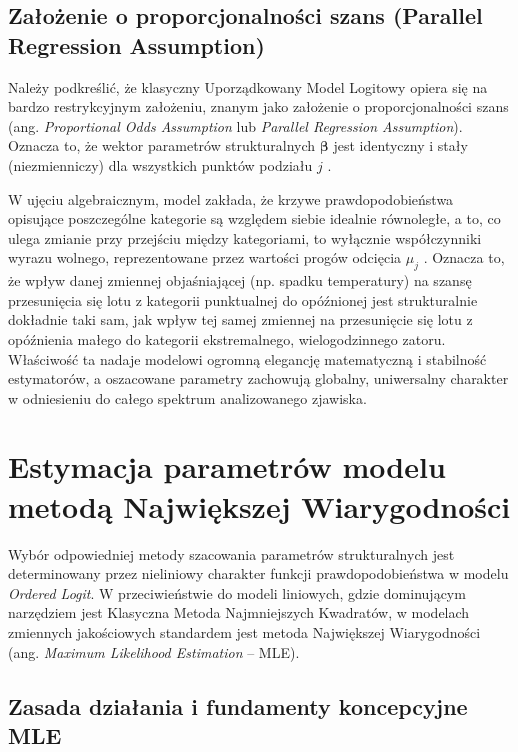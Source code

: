 \subsection{Założenie o proporcjonalności szans (Parallel Regression Assumption)}

Należy podkreślić, że klasyczny Uporządkowany Model Logitowy opiera się na bardzo restrykcyjnym założeniu, znanym jako założenie o proporcjonalności szans (ang. \textit{Proportional Odds Assumption} lub \textit{Parallel Regression Assumption}). Oznacza to, że wektor parametrów strukturalnych $\boldsymbol{\beta}$ jest identyczny i stały (niezmienniczy) dla wszystkich punktów podziału $j$ \cite{greene2003}.

W ujęciu algebraicznym, model zakłada, że krzywe prawdopodobieństwa opisujące poszczególne kategorie są względem siebie idealnie równoległe, a to, co ulega zmianie przy przejściu między kategoriami, to wyłącznie współczynniki wyrazu wolnego, reprezentowane przez wartości progów odcięcia $\mu_j$ \cite{jackowska2011}. Oznacza to, że wpływ danej zmiennej objaśniającej (np. spadku temperatury) na szansę przesunięcia się lotu z kategorii punktualnej do opóźnionej jest strukturalnie dokładnie taki sam, jak wpływ tej samej zmiennej na przesunięcie się lotu z opóźnienia małego do kategorii ekstremalnego, wielogodzinnego zatoru. Właściwość ta nadaje modelowi ogromną elegancję matematyczną i stabilność estymatorów, a oszacowane parametry zachowują globalny, uniwersalny charakter w odniesieniu do całego spektrum analizowanego zjawiska. 

\section{Estymacja parametrów modelu metodą Największej Wiarygodności}

Wybór odpowiedniej metody szacowania parametrów strukturalnych jest determinowany przez nieliniowy charakter funkcji prawdopodobieństwa w modelu \textit{Ordered Logit}. W przeciwieństwie do modeli liniowych, gdzie dominującym narzędziem jest Klasyczna Metoda Najmniejszych Kwadratów, w modelach zmiennych jakościowych standardem jest metoda Największej Wiarygodności (ang. \textit{Maximum Likelihood Estimation} -- MLE).

\subsection{Zasada działania i fundamenty koncepcyjne MLE}

